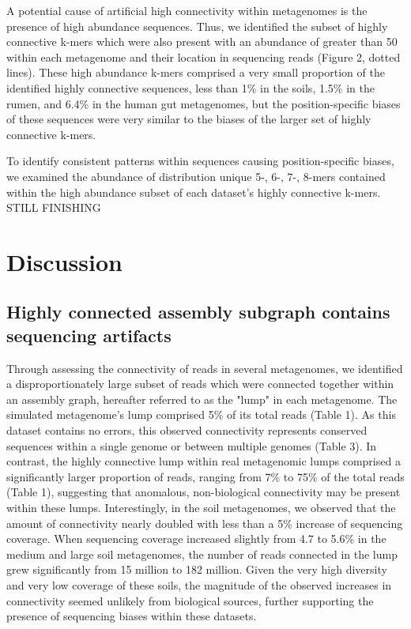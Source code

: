 \documentclass[10pt]{article}
\begin{document}
A potential cause of artificial high connectivity within metagenomes is the presence of high abundance sequences.  Thus, we identified the subset of highly connective k-mers which were also present with an abundance of greater than 50 within each metagenome and their location in sequencing reads (Figure 2, dotted lines).   These high abundance k-mers comprised a very small proportion of the identified highly connective sequences, less than 1\% in the soils, 1.5\% in the rumen, and 6.4\% in the human gut metagenomes, but the position-specific biases of these sequences were very similar to the biases of the larger set of highly connective k-mers.

To identify consistent patterns within sequences causing position-specific biases, we examined the abundance of distribution unique 5-, 6-, 7-, 8-mers contained within the high abundance subset of each dataset's highly connective k-mers. STILL FINISHING

\section*{Discussion}

\subsection*{Highly connected assembly subgraph contains sequencing artifacts}

Through assessing the connectivity of reads in several metagenomes, we identified a disproportionately large subset of reads which were connected together within an assembly graph, hereafter referred to as the "lump" in each metagenome.  The simulated metagenome's lump comprised 5\% of its total reads (Table 1).  As this dataset contains no errors, this observed connectivity represents conserved sequences within a single genome or between multiple genomes (Table 3).  In contrast, the highly connective lump within real metagenomic lumps comprised a significantly larger proportion of reads, ranging from 7\% to 75\% of the total reads (Table 1), suggesting that anomalous, non-biological connectivity may be present within these lumps.  Interestingly, in the soil metagenomes, we observed that the amount of connectivity nearly doubled with less than a 5\% increase of sequencing coverage.  When sequencing coverage increased slightly from 4.7 to 5.6\% in the medium and large soil metagenomes, the number of reads connected in the lump grew significantly from 15 million to 182 million.  Given the very high diversity and very low coverage of these soils, the magnitude of the observed increases in connectivity seemed unlikely from biological sources, further supporting the presence of sequencing biases within these datasets.  
\end{document}
